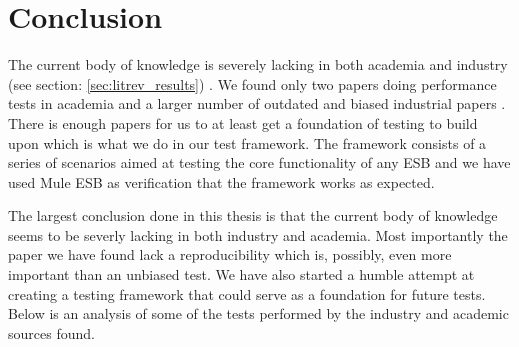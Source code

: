\section{Conclusion}

The current body of knowledge is severely lacking in both academia and industry (see section: \ref{sec:litrev_results}) . 
We found only two papers \cite{Sanjay2011,Garcia2010} doing performance tests in academia and a larger number of outdated and biased industrial papers \cite{Perera07,Perera07R2,Perera07R3,mulesoft08}.
There is enough papers for us to at least get a foundation of testing to build upon which is what we do in our test framework. 
The framework consists of a series of scenarios aimed at testing the core functionality of any ESB and we have used Mule ESB as verification that the framework works as expected. 

The largest conclusion done in this thesis is that the current body of knowledge seems to be severly lacking in both industry and academia. 
Most importantly the paper we have found \cite{Sanjay2011} lack a reproducibility which is, possibly, even more important than an unbiased test. 
We have also started a humble attempt at creating a testing framework that could serve as a foundation for future tests. 
Below is an analysis of some of the tests performed by the industry and academic sources found.

